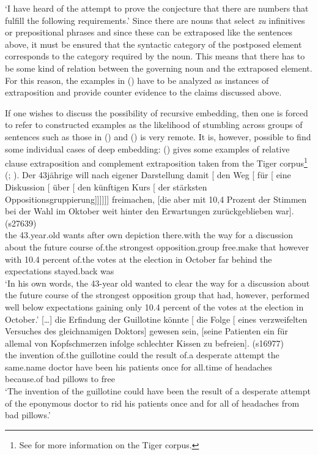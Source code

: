 \glt `I have heard of the attempt to prove the conjecture that there are numbers that fulfill the following requirements.'
\zl
Since there are nouns that select \emph{zu} infinitives or prepositional phrases and since these can
be extraposed like the sentences above, it must be ensured that the syntactic category of the postposed element corresponds to the category required by the noun.
This means that there has to be some kind of relation between the governing noun and the extraposed element. For this reason, the examples in
() have to be analyzed as instances of extraposition and provide counter evidence to the claims discussed above.

If one wishes to discuss the possibility of recursive embedding, then one is forced to refer to constructed examples as the likelihood of stumbling across groups of sentences
such as those in () and () is very remote. It is, however, possible to find some individual cases of deep embedding:
() gives some examples of relative clause extraposition and complement extraposition taken from the Tiger corpus\footnote{
  See  for more information on the Tiger corpus.
} (\citealp[--79]{Mueller2007c}; \citealp[Section~2.1]{MM2009a}).
\eal
\ex 
\gll Der 43jährige will nach eigener Darstellung damit [ den Weg [ für [ eine
  Diskussion [ über [ den künftigen Kurs [ der stärksten
  Oppositions\-gruppierung]]]]]] freimachen, [die aber mit 10,4 Prozent
  der Stimmen bei der Wahl im
  Oktober weit hinter den Erwartungen zurückgeblieben war]. (s27639)\\
  the 43.year.old wants after own depiction there.with {} the way {} for {} a discussion {} about {} the future course {} of.the strongest
  opposition.group free.make \spacebr{}that however with 10.4 percent
  of.the votes at the election in October far behind the expectations stayed.back was\\
\glt `In his own words, the 43-year old wanted to clear the way for a discussion about the future course of the strongest opposition group that had, however, performed well below expectations gaining only 10.4 percent of the votes at the election in October.'
\ex 
\gll {}[\ldots] die Erfindung der Guillotine könnte [ die Folge [ eines verzweifelten
    Versuches des gleichnamigen Doktors] gewesen sein, [seine Patienten ein für allemal von
    Kopfschmerzen infolge schlechter Kissen zu befreien]. (s16977)\\
	{}{} the invention of.the guillotine could {} the result {} of.a desperate attempt the same.name doctor have been \spacebr{}his patients
once for all.time of headaches because.of bad pillows to free\\
\glt `The invention of the guillotine could have been the result of a desperate attempt of the
eponymous doctor to rid his patients once and for all of headaches from bad pillows.'
\zl

